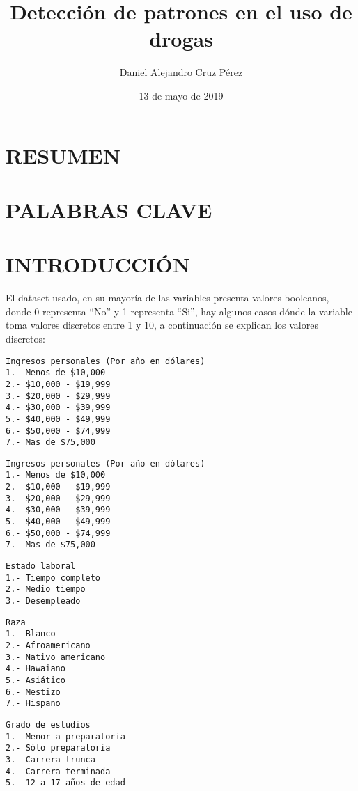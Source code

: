 \documentclass[]{article}
\title{Detección de patrones en el uso de drogas}
\author{Daniel Alejandro Cruz Pérez}
\date{13 de mayo de 2019}
\begin{document}
\maketitle

\section{RESUMEN}\label{resumen}

\section{PALABRAS CLAVE}\label{palabras-clave}

\section{INTRODUCCIÓN}\label{introduccion}

El dataset usado, en su mayoría de las variables presenta valores
booleanos, donde 0 representa ``No'' y 1 representa ``Si'', hay algunos
casos dónde la variable toma valores discretos entre 1 y 10, a
continuación se explican los valores discretos:

\begin{verbatim}
Ingresos personales (Por año en dólares) 
1.- Menos de $10,000
2.- $10,000 - $19,999
3.- $20,000 - $29,999
4.- $30,000 - $39,999
5.- $40,000 - $49,999
6.- $50,000 - $74,999
7.- Mas de $75,000
\end{verbatim}

\begin{verbatim}
Ingresos personales (Por año en dólares) 
1.- Menos de $10,000
2.- $10,000 - $19,999
3.- $20,000 - $29,999
4.- $30,000 - $39,999
5.- $40,000 - $49,999
6.- $50,000 - $74,999
7.- Mas de $75,000
\end{verbatim}

\begin{verbatim}
Estado laboral
1.- Tiempo completo
2.- Medio tiempo
3.- Desempleado
\end{verbatim}

\begin{verbatim}
Raza
1.- Blanco
2.- Afroamericano
3.- Nativo americano
4.- Hawaiano
5.- Asiático
6.- Mestizo
7.- Hispano
\end{verbatim}

\begin{verbatim}
Grado de estudios
1.- Menor a preparatoria
2.- Sólo preparatoria
3.- Carrera trunca
4.- Carrera terminada
5.- 12 a 17 años de edad
\end{verbatim}
\end{document}
